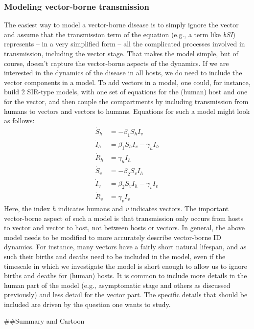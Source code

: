 \documentclass[]{book}
\theoremstyle{definition}
\theoremstyle{definition}
\theoremstyle{definition}
\theoremstyle{remark}
\begin{document}
\hypertarget{myadvancedbox}{%
\subsubsection{Modeling vector-borne transmission}\label{myadvancedbox}}

The easiest way to model a vector-borne disease is to simply ignore the
vector and assume that the transmission term of the equation (e.g., a
term like \emph{bSI}) represents -- in a very simplified form -- all the
complicated processes involved in transmission, including the vector
stage. That makes the model simple, but of course, doesn't capture the
vector-borne aspects of the dynamics. If we are interested in the
dynamics of the disease in all hosts, we do need to include the vector
components in a model. To add vectors in a model, one could, for
instance, build 2 SIR-type models, with one set of equations for the
(human) host and one for the vector, and then couple the compartments by
including transmission from humans to vectors and vectors to humans.
Equations for such a model might look as follows: \[
\begin{aligned}
\dot S_h &= - \beta_1 S_h I_v \\
\dot I_h &= \beta_1S_h I_v - \gamma_h I_h \\
\dot R_h &= \gamma_h I_h \\
\dot S_v &= - \beta_2 S_v I_h \\
\dot I_v &= \beta_2 S_v I_h - \gamma_v I_v \\
\dot R_v &= \gamma_v I_v
\end{aligned}
\] Here, the index \emph{h} indicates humans and \emph{v} indicates
vectors. The important vector-borne aspect of such a model is that
transmission only occurs from hosts to vector and vector to host, not
between hosts or vectors. In general, the above model needs to be
modified to more accurately describe vector-borne ID dynamics. For
instance, many vectors have a fairly short natural lifespan, and as such
their births and deaths need to be included in the model, even if the
timescale in which we investigate the model is short enough to allow us
to ignore births and deaths for (human) hosts. It is common to include
more details in the human part of the model (e.g., asymptomatic stage
and others as discussed previously) and less detail for the vector part.
The specific details that should be included are driven by the question
one wants to study.

\#\#Summary and Cartoon
\end{document}
